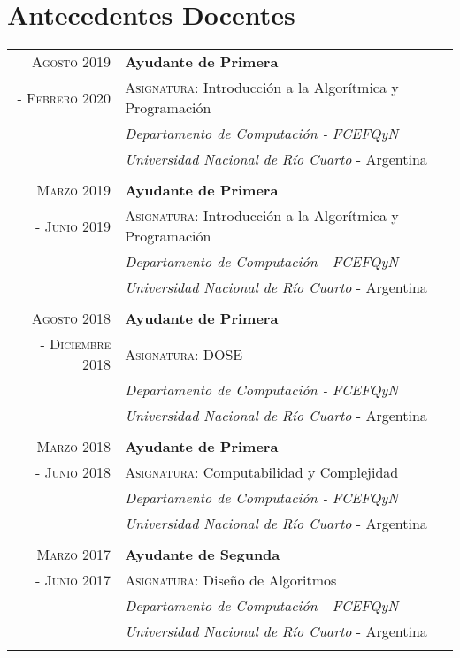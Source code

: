 \documentclass[a4paper,10pt]{article} %
\begin{document}
\section{Antecedentes Docentes}

\begin{longtable}{rl}
\\

\textsc{Agosto 2019} & \textbf{Ayudante de Primera} \\
\textsc{- Febrero 2020} & \textsc{Asignatura:} Introducción a la Algorítmica y Programación \\
& \textit{Departamento de Computación - FCEFQyN} \\
& \textit{Universidad Nacional de Río Cuarto} - Argentina \\ & \\

\textsc{Marzo 2019} & \textbf{Ayudante de Primera} \\
\textsc{- Junio 2019} & \textsc{Asignatura:} Introducción a la Algorítmica y Programación \\ 
& \textit{Departamento de Computación - FCEFQyN} \\
& \textit{Universidad Nacional de Río Cuarto} - Argentina \\ & \\

\textsc{Agosto 2018} & \textbf{Ayudante de Primera} \\
\textsc{- Diciembre 2018} & \textsc{Asignatura:} DOSE \\ 
& \textit{Departamento de Computación - FCEFQyN} \\
& \textit{Universidad Nacional de Río Cuarto} - Argentina \\ & \\

\textsc{Marzo 2018} & \textbf{Ayudante de Primera} \\
\textsc{- Junio 2018} & \textsc{Asignatura:} Computabilidad y Complejidad \\ 
& \textit{Departamento de Computación - FCEFQyN} \\
& \textit{Universidad Nacional de Río Cuarto} - Argentina \\ & \\

\textsc{Marzo 2017} & \textbf{Ayudante de Segunda} \\
\textsc{- Junio 2017} & \textsc{Asignatura:} Diseño de Algoritmos \\ & \textit{Departamento de Computación - FCEFQyN} \\  
& \textit{Universidad Nacional de Río Cuarto} - Argentina \\ & \\


\end{longtable}
\end{document}
